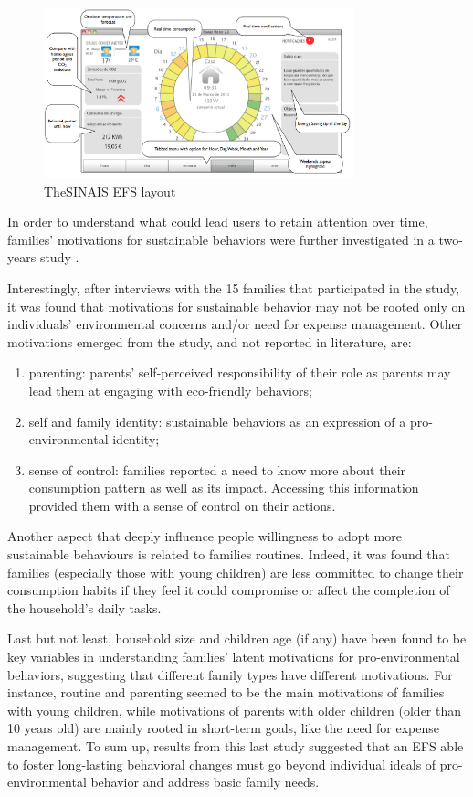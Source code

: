 \begin{figure}[h]
\centering
\includegraphics[width=0.8\textwidth]{./Images/efs1}
\caption{The\ac{SINAIS} \ac{EFS} layout}
\label{fig:efs1}
\end{figure}


In order to understand what could lead users to retain attention over time, families’ motivations for sustainable behaviors were further investigated in a two-years study \cite{Barreto2014}.


Interestingly, after interviews with the 15 families that participated in the study, it was found that motivations for sustainable behavior may not be rooted only on individuals’ environmental concerns and/or need for expense management. Other motivations emerged from the study, and not reported in literature, are:

\begin{enumerate}
    \item parenting: parents’ self-perceived responsibility of their role as parents may lead them at engaging with eco-friendly behaviors;
    \item self and family identity: sustainable behaviors as an expression of a pro-environmental identity;
    \item sense of control: families reported a need to know more about their consumption pattern as well as its impact. Accessing this information provided them with a sense of control on their actions.
\end{enumerate}

Another aspect that deeply influence people willingness to adopt more sustainable behaviours  is related to families routines. Indeed, it was found that families (especially those with young children) are less committed to change their consumption habits if they feel it could compromise or affect the completion of the household’s daily tasks. 


Last but not least, household size and children age (if any) have been found to be key variables in understanding families’ latent motivations for pro-environmental behaviors, suggesting that different family types have different motivations. For instance, routine and parenting seemed to be the main motivations of families with young children, while motivations of parents with older children (older than 10 years old) are mainly rooted in short-term goals, like the need for expense management. To sum up, results from this last study suggested that an EFS able to foster long-lasting behavioral changes must go beyond individual ideals of pro-environmental behavior and address basic family needs.


